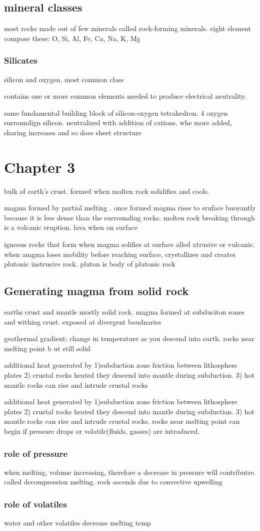 \documentclass[11pt]{amsart}
\begin{document}
  \subsection{mineral classes}
  \par most rocks made out of few minerals called rock-forming minerals.
  eight element compose these: O, Si, Al, Fe, Ca, Na, K, Mg
  \subsubsection{Silicates}
  \par silicon and oxygen, most common class
  \par contains one or more common elements needed to produce electrical
  neutrality.
  \par same fundamental building block of silicon-oxygen tetrahedron. 4
  oxygen surroundign silicon. neutralized with addition of cations. whe more
  added, sharing increases and so does sheet structure
  \section{Chapter 3}
  \par bulk of earth's crust. formed when molten rock solidifies and cools.
  \par magma formed by partial melting . once formed magma rises to sruface
  buoyantly because it is less dense than the surrounding rocks. molten
  rock breaking through is a volcanic eruption. lava when on surface
  \par igneous rocks that form when magma solifies at surface alled
  xtrusive or vulcanic. when amgma loses mobility before reaching
  surface, crystallizes and creates plutonic instrusive rock. pluton is body
  of plutonic rock
  \subsection{Generating magma from solid rock}
  \par earths crust and mantle mostly solid rock. magma formed at
  subduciton sones and withing crust. exposed at divergent boudnaries
  \par geothermal gradient: change in temperature as you descend into earth.
  rocks near melting point b ut still solid
  \par additional heat generated by 1)subduction zone friction between
  lithosphere plates 2) crustal rocks heated they descend into mantle during
  subduction. 3) hot mantle rocks can rise and intrude crustal rocks
  \par additional heat generated by 1)subduction zone friction between
  lithosphere plates 2) crustal rocks heated they descend into mantle during
  subduction. 3) hot mantle rocks can rise and intrude crustal rocks. rocks
  near melting point can begin if pressure drops or volatile(fluids, gasses)
  are introduced.
  \subsubsection{role of pressure}
  \par when melting, volume increasing, therefore a decrease in
  pressure will contributre. called decompression melting. rock ascends
  due to convective upwelling
  \subsubsection{role of volatiles}
  \par water and other volatiles decrease melting temp
\end{document}
